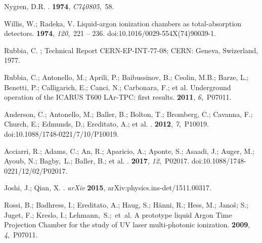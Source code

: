 \documentclass[instruments,article,accept,moreauthors,pdftex]{Definitions/mdpi}
\begin{document}

\begin{thebibliography}{999}

Nygren, D.R.
.
 {\bf 1974}, {\em C740805},~58.

Willis, W.; Radeka, V.
\newblock Liquid-argon ionization chambers as total-absorption detectors.
 {\bf 1974}, {\em 120},~221 --
  236.
\newblock
  doi:10.1016/0029-554X(74)90039-1.

Rubbia, C.
;
\newblock Technical Report CERN-EP-INT-77-08; {CERN}: Geneva, Swizerland,  1977.

Rubbia, C.; Antonello, M.; Aprili, P.; Baibussinov, B.; Ceolin, M.B.; Barze, L.; Benetti, P.; Calligarich, E.; Canci, N.; Carbonara, F.; et al.
\newblock Underground operation of the ICARUS T600 LAr-TPC: first results.
 {\bf 2011}, {\em 6},~P07011.

Anderson, C.; Antonello, M.; Baller, B.; Bolton, T.; Bromberg, C.; Cavanna, F.; Church, E.; Edmunds, D.; Ereditato, A.; et al.
.
 {\bf 2012}, {\em 7},~P10019.
\newblock
  doi:10.1088/1748-0221/7/10/P10019.

Acciarri, R.; Adams, C.; An, R.; Aparicio, A.; Aponte, S.; Asaadi, J.; Auger, M.; Ayoub, N.; Bagby,~L.; Baller, B.; et al.
.
 {\bf 2017}, {\em 12},~P02017.
\newblock
  doi:10.1088/1748-0221/12/02/P02017.

Joshi, J.; Qian, X.
. \emph{arXiv} {\bf 2015}, arXiv:physics.ins-det/1511.00317.

Rossi, B.; Badhress, I.; Ereditato, A.; Haug, S.; Hänni, R.; Hess, M.; Janoŝ; S.; Juget, F.; Kreslo, I.; Lehmann,~S.;~et~al.
\newblock A prototype liquid Argon Time Projection Chamber for the study of UV
  laser multi-photonic ionization.
 {\bf 2009}, {\em 4},~P07011.


\end{thebibliography}
\end{document}
